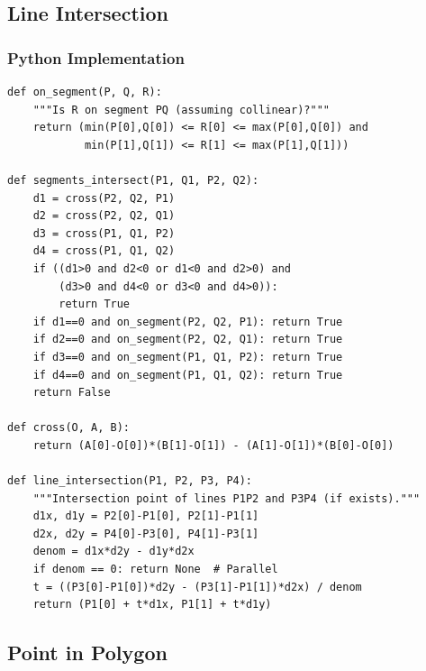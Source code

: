\documentclass[10pt,a4paper]{article}
\theoremstyle{cpstyle}
\begin{document}
\subsection{Line Intersection}

\subsubsection{Python Implementation}
\begin{lstlisting}[caption={Line segment intersection}]
def on_segment(P, Q, R):
    """Is R on segment PQ (assuming collinear)?"""
    return (min(P[0],Q[0]) <= R[0] <= max(P[0],Q[0]) and
            min(P[1],Q[1]) <= R[1] <= max(P[1],Q[1]))

def segments_intersect(P1, Q1, P2, Q2):
    d1 = cross(P2, Q2, P1)
    d2 = cross(P2, Q2, Q1)
    d3 = cross(P1, Q1, P2)
    d4 = cross(P1, Q1, Q2)
    if ((d1>0 and d2<0 or d1<0 and d2>0) and
        (d3>0 and d4<0 or d3<0 and d4>0)):
        return True
    if d1==0 and on_segment(P2, Q2, P1): return True
    if d2==0 and on_segment(P2, Q2, Q1): return True
    if d3==0 and on_segment(P1, Q1, P2): return True
    if d4==0 and on_segment(P1, Q1, Q2): return True
    return False

def cross(O, A, B):
    return (A[0]-O[0])*(B[1]-O[1]) - (A[1]-O[1])*(B[0]-O[0])

def line_intersection(P1, P2, P3, P4):
    """Intersection point of lines P1P2 and P3P4 (if exists)."""
    d1x, d1y = P2[0]-P1[0], P2[1]-P1[1]
    d2x, d2y = P4[0]-P3[0], P4[1]-P3[1]
    denom = d1x*d2y - d1y*d2x
    if denom == 0: return None  # Parallel
    t = ((P3[0]-P1[0])*d2y - (P3[1]-P1[1])*d2x) / denom
    return (P1[0] + t*d1x, P1[1] + t*d1y)
\end{lstlisting}

\subsection{Point in Polygon}
\end{document}
